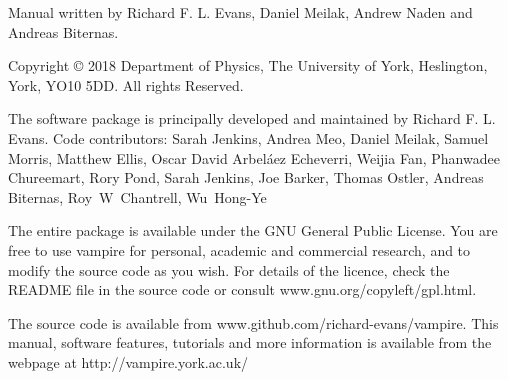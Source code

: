 \noindent Manual written by Richard F. L. Evans, Daniel Meilak, Andrew Naden and Andreas Biternas.\\
\par
\noindent Copyright \copyright \xspace 2018 Department of Physics, The University of York, Heslington, York, YO10 5DD. All rights Reserved.\\
\par
\noindent The \vampire software package is principally developed and maintained by Richard F. L. Evans. Code contributors: Sarah Jenkins, Andrea Meo, Daniel Meilak, Samuel Morris, Matthew Ellis, Oscar David Arbel\'aez Echeverri, Weijia Fan, Phanwadee Chureemart, Rory Pond, Sarah Jenkins, Joe Barker, Thomas Ostler, Andreas Biternas, Roy~W~Chantrell, Wu~Hong-Ye\\
\par
\noindent The entire \vampire package is available under the GNU General Public License. You are free to use vampire for personal, academic and commercial research, and to modify the source code as you wish. For details of the licence, check the README file in the source code or consult www.gnu.org/copyleft/gpl.html.\\
\par
\noindent The \vampire source code is available from www.github.com/richard-evans/vampire. This manual, software features, tutorials and more information is available from the \vampire webpage at http://vampire.york.ac.uk/\\
